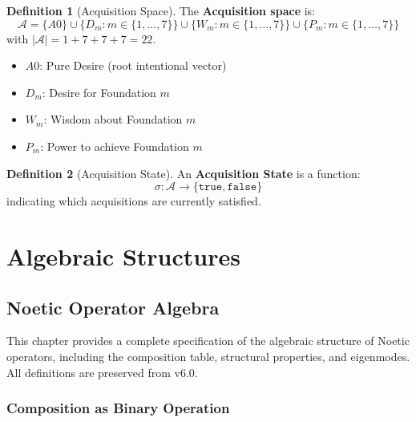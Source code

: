\documentclass[11pt,twoside,openright]{book}
\theoremstyle{definition}
\newtheorem{definition}{Definition}[chapter]
\theoremstyle{plain}
\theoremstyle{remark}
\newcommand{\Acquisitions}{\mathcal{A}}
\newcommand{\AcqState}{\sigma}
\begin{document}
\begin{definition}[Acquisition Space]
\label{def:acq-space}
The \textbf{Acquisition space} is:
\[
\Acquisitions = \{A0\} \cup \{D_m : m \in \{1,\ldots,7\}\} \cup \{W_m : m \in \{1,\ldots,7\}\} \cup \{P_m : m \in \{1,\ldots,7\}\}
\]
with $|\Acquisitions| = 1 + 7 + 7 + 7 = 22$.

\begin{itemize}
  \item $A0$: Pure Desire (root intentional vector)
  \item $D_m$: Desire for Foundation $m$
  \item $W_m$: Wisdom about Foundation $m$
  \item $P_m$: Power to achieve Foundation $m$
\end{itemize}
\end{definition}

\begin{definition}[Acquisition State]
\label{def:acq-state}
An \textbf{Acquisition State} is a function:
\[
\AcqState : \Acquisitions \to \{\mathtt{true}, \mathtt{false}\}
\]
indicating which acquisitions are currently satisfied.
\end{definition}

\part{Algebraic Structures}

\chapter{Noetic Operator Algebra}
\label{ch:noetic-algebra}

This chapter provides a complete specification of the algebraic structure of Noetic operators, including the composition table, structural properties, and eigenmodes. All definitions are preserved from v6.0.

\section{Composition as Binary Operation}
\end{document}
